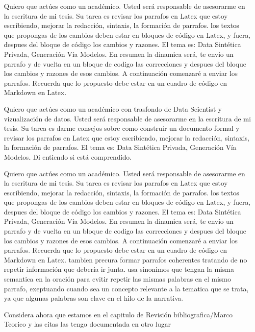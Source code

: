 Quiero que actúes como un académico. Usted será responsable de asesorarme en la escritura de mi tesis. Su tarea es revisar los parrafos en Latex que estoy escribiendo, mejorar la redacción, sintaxis, la formación de parrafos. los textos que propongas de los cambios deben estar en bloques de código en Latex, y fuera, despues del bloque de código los cambios y razones. El tema es: Data Sintética Privada, Generación Vía Modelos. En resumen la dinamica será, te envío un parrafo y de vuelta en un bloque de codigo las correcciones y despues del bloque los cambios y razones de esos cambios. A continuación comenzaré a enviar los parrafos. Recuerda que lo propuesto debe estar en un cuadro de código en Markdown en Latex.



Quiero que actúes como un académico con trasfondo de Data Scientist y vizualización de datos. Usted será responsable de asesorarme en la escritura de mi tesis. Su tarea es darme consejos sobre como construir un documento formal y revisar los parrafos en Latex que estoy escribiendo, mejorar la redacción, sintaxis, la formación de parrafos. El tema es: Data Sintética Privada, Generación Vía Modelos. Di entiendo si está comprendido.




Quiero que actúes como un académico. Usted será responsable de asesorarme en la escritura de mi tesis. Su tarea es revisar los parrafos en Latex que estoy escribiendo, mejorar la redacción, sintaxis, la formación de parrafos. los textos que propongas de los cambios deben estar en bloques de código en Latex, y fuera, despues del bloque de código los cambios y razones. El tema es: Data Sintética Privada, Generación Vía Modelos. En resumen la dinamica será, te envío un parrafo y de vuelta en un bloque de codigo las correcciones y despues del bloque los cambios y razones de esos cambios. A continuación comenzaré a enviar los parrafos. Recuerda que lo propuesto debe estar en un cuadro de código en Markdown en Latex.
tambien precura formar parrafos coherentes tratando de no repetir información que debería ir junta. 
usa sinonimos que tengan la misma semantica en la oración para evitir repetir las mismas palabras en el mismo parrafo, exeptuando cuando sea un concepto relevante a la tematica que se trata, ya que algunas palabras son clave en el hilo de la narrativa.

Considera ahora que estamos en el capitulo de Revisión bibliografica/Marco Teorico y las citas las tengo documentada en otro lugar
